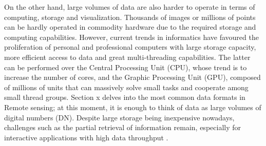 On the other hand, large volumes of data are also harder to operate in terms of computing, storage and visualization. Thousands of images or millions of points can be hardly operated in commodity hardware due to the required storage and computing capabilities. However, current trends in informatics have favoured the proliferation of personal and professional computers with large storage capacity, more efficient access to data and great multi-threading capabilities. The latter can be performed over the Central Processing Unit (CPU), whose trend is to increase the number of cores, and the Graphic Processing Unit (GPU), composed of millions of units that can massively solve small tasks and cooperate among small thread groups. Section x delves into the most common data formats in \gls{Remote sensing}; at this moment, it is enough to think of data as large volumes of digital numbers (DN). Despite large storage being inexpensive nowadays, challenges such as the partial retrieval of information remain, especially for interactive applications with high data throughput \cite{bejar-martos_strategies_2022, ogayar-anguita_nested_2023}. 


